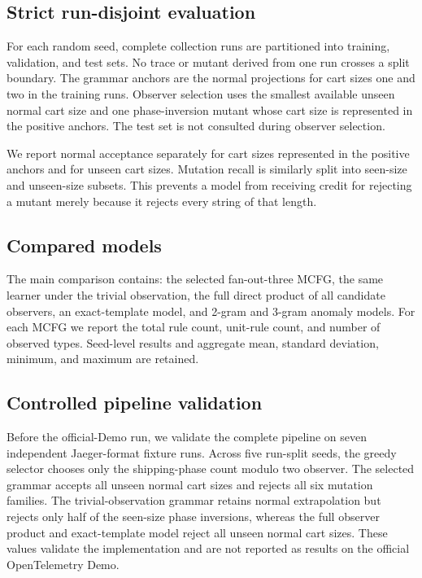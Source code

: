 \subsection{Strict run-disjoint evaluation}

For each random seed, complete collection runs are partitioned into training,
validation, and test sets.  No trace or mutant derived from one run crosses a
split boundary.  The grammar anchors are the normal projections for cart sizes
one and two in the training runs.  Observer selection uses the smallest
available unseen normal cart size and one phase-inversion mutant whose cart size
is represented in the positive anchors.  The test set is not consulted during
observer selection.

We report normal acceptance separately for cart sizes represented in the
positive anchors and for unseen cart sizes.  Mutation recall is similarly split
into seen-size and unseen-size subsets.  This prevents a model from receiving
credit for rejecting a mutant merely because it rejects every string of that
length.

\subsection{Compared models}

The main comparison contains: the selected fan-out-three MCFG, the same learner
under the trivial observation, the full direct product of all candidate
observers, an exact-template model, and 2-gram and 3-gram anomaly models.  For
each MCFG we report the total rule count, unit-rule count, and number of observed
types.  Seed-level results and aggregate mean, standard deviation, minimum, and
maximum are retained.

\subsection{Controlled pipeline validation}

Before the official-Demo run, we validate the complete pipeline on seven
independent Jaeger-format fixture runs.  Across five run-split seeds, the greedy
selector chooses only the shipping-phase count modulo two observer.  The
selected grammar accepts all unseen normal cart sizes and rejects all six
mutation families.  The trivial-observation grammar retains normal
extrapolation but rejects only half of the seen-size phase inversions, whereas
the full observer product and exact-template model reject all unseen normal cart
sizes.  These values validate the implementation and are not reported as
results on the official OpenTelemetry Demo.
